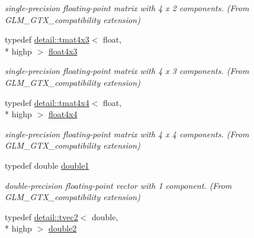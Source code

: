 \begin{DoxyCompactItemize}
\begin{DoxyCompactList}\small\item\em single-\/precision floating-\/point matrix with 4 x 2 components. (From G\-L\-M\-\_\-\-G\-T\-X\-\_\-compatibility extension) \end{DoxyCompactList}\item 
\hypertarget{group__gtx__compatibility_ga72398a5d715031923beca8907c52f5d6}{typedef \hyperlink{structglm_1_1detail_1_1tmat4x3}{detail\-::tmat4x3}$<$ float, \\*
highp $>$ \hyperlink{group__gtx__compatibility_ga72398a5d715031923beca8907c52f5d6}{float4x3}}\label{group__gtx__compatibility_ga72398a5d715031923beca8907c52f5d6}

\begin{DoxyCompactList}\small\item\em single-\/precision floating-\/point matrix with 4 x 3 components. (From G\-L\-M\-\_\-\-G\-T\-X\-\_\-compatibility extension) \end{DoxyCompactList}\item 
\hypertarget{group__gtx__compatibility_ga1f48a19e35b3640cf3d509041f7a800b}{typedef \hyperlink{structglm_1_1detail_1_1tmat4x4}{detail\-::tmat4x4}$<$ float, \\*
highp $>$ \hyperlink{group__gtx__compatibility_ga1f48a19e35b3640cf3d509041f7a800b}{float4x4}}\label{group__gtx__compatibility_ga1f48a19e35b3640cf3d509041f7a800b}

\begin{DoxyCompactList}\small\item\em single-\/precision floating-\/point matrix with 4 x 4 components. (From G\-L\-M\-\_\-\-G\-T\-X\-\_\-compatibility extension) \end{DoxyCompactList}\item 
\hypertarget{group__gtx__compatibility_gab8b88350212cea916857cb2f49b8a29f}{typedef double \hyperlink{group__gtx__compatibility_gab8b88350212cea916857cb2f49b8a29f}{double1}}\label{group__gtx__compatibility_gab8b88350212cea916857cb2f49b8a29f}

\begin{DoxyCompactList}\small\item\em double-\/precision floating-\/point vector with 1 component. (From G\-L\-M\-\_\-\-G\-T\-X\-\_\-compatibility extension) \end{DoxyCompactList}\item 
\hypertarget{group__gtx__compatibility_ga227d30a4fa630c9e3fb6c7ea87250c62}{typedef \hyperlink{structglm_1_1detail_1_1tvec2}{detail\-::tvec2}$<$ double, \\*
highp $>$ \hyperlink{group__gtx__compatibility_ga227d30a4fa630c9e3fb6c7ea87250c62}{double2}}\label{group__gtx__compatibility_ga227d30a4fa630c9e3fb6c7ea87250c62}


\end{DoxyCompactItemize}

